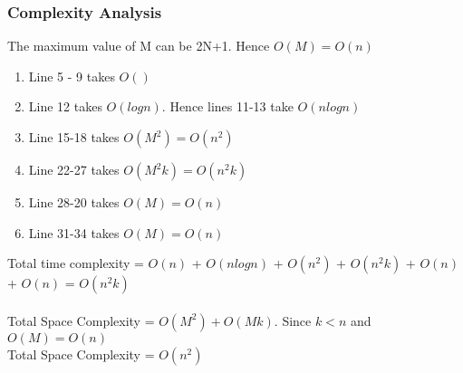 \documentclass[12pt]{article}
\begin{document}
\subsubsection{Complexity Analysis}

The maximum value of M can be 2N+1. Hence $O(M) = O(n)$

\begin{enumerate}
\item Line 5 - 9 takes $O()$
\item Line 12 takes $O(logn)$. Hence lines 11-13 take $O(nlogn)$
\item Line 15-18 takes $O(M^2) = O(n^2)$
\item Line 22-27 takes $O(M^2k) = O(n^2k)$
\item Line 28-20 takes $O(M) = O(n)$
\item Line 31-34 takes $O(M) = O(n)$
\end{enumerate}

Total time complexity = $O(n)$ + $O(nlogn)$ + $O(n^2)$ + $O(n^2k)$ + $O(n)$ + $O(n)$ = $O(n^2k)$
\\\\
Total Space Complexity  = $O(M^2) + O(Mk)$. Since $k < n$ and $O(M) = O(n)$\\
Total Space Complexity  = $O(n^2)$
\end{document}
